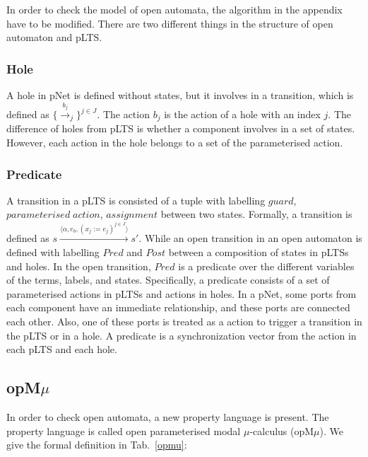 \documentclass[runningheads,a4paper]{llncs}
\begin{document}
 In order to check the model of open automata, the algorithm in the appendix have to be modified. There are two different things in the structure of open automaton and pLTS.
 \subsubsection{Hole}
 A hole in pNet is defined without states, but it involves in a transition, which is defined as $\{\xrightarrow{b_j}_j\}^{j\in J}$. The action $b_{j}$ is the action of a hole with an index $j$. The difference of holes from pLTS is whether a component involves in a set of states. However, each action in the hole belongs to a set of the parameterised action.
 
 
 
 \subsubsection{Predicate}
 A transition in a pLTS is consisted of a tuple with labelling $guard$, $parameterised\; action$, $assignment$ between two states. Formally, a transition is defined as $s\xrightarrow{\langle\alpha, e_{b}, (x_{j}:=e_{j})^{j\in J}\rangle}s'$. While an open transition in an open automaton is defined with labelling $Pred$ and $Post$ between a composition of states in pLTSs and holes. In the open transition, $Pred$ is a predicate over the different variables of the terms, labels, and states. Specifically, a predicate consists of a set of parameterised actions in pLTSs and actions in holes. In a pNet, some ports from each component have an immediate relationship, and these ports are connected each other. Also, one of these ports is treated as a action to trigger a transition in the pLTS or in a hole. A predicate is a synchronization vector from the action in each pLTS and each hole.
 
\subsection{opM$\mu$}
In order to check open automata, a new property language is present. The property language is called open parameterised modal $\mu$-calculus (opM$\mu$). We give the formal definition in Tab.~\ref{opmu}:
\end{document}
